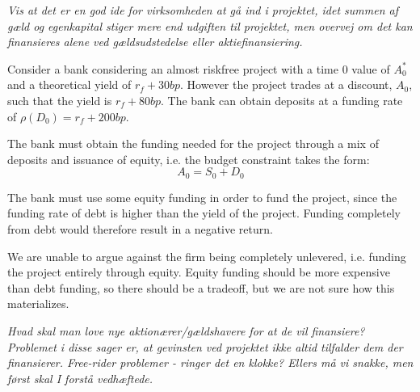 \documentclass[10pt,a4paper]{article}
\begin{document}
        \textit{Vis at det er en god ide for virksomheden at gå ind i projektet, idet summen af gæld og egenkapital stiger mere end udgiften til projektet, men overvej om det kan finansieres alene ved gældsudstedelse eller aktiefinansiering.} 

        Consider a bank considering an almost riskfree project with a time $0$ value of $A_{0}^{\ast}$ and a theoretical yield of $r_{f} + 30bp$. However the project trades at a discount, $A_{0}$, such that the yield is $r_{f} + 80bp$. The bank can obtain deposits at a funding rate of $\rho(D_{0}) = r_{f} + 200bp$.

        The bank must obtain the funding needed for the project through a mix of deposits and issuance of equity, i.e. the budget constraint takes the form:
            \begin{equation}
                A_{0} = S_{0} + D_{0}
            \end{equation}

        The bank must use some equity funding in order to fund the project, since the funding rate of debt is higher than the yield of the project. Funding completely from debt would therefore result in a negative return. 

        We are unable to argue against the firm being completely unlevered, i.e. funding the project entirely through equity. Equity funding should be more expensive than debt funding, so there should be a tradeoff, but we are not sure how this materializes. 
        
        \textit{Hvad skal man love nye aktionærer/gældshavere for at de vil finansiere? Problemet i disse sager er, at gevinsten ved projektet ikke altid tilfalder dem der finansierer. Free-rider problemer - ringer det en klokke? Ellers må vi snakke, men først skal I forstå vedhæftede.}
\end{document}
